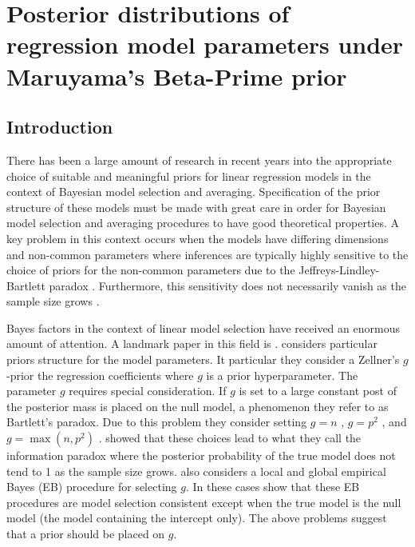 \chapter{Posterior distributions of regression model parameters under Maruyama's Beta-Prime prior}

\section{Introduction}

There has been a large amount of research in recent years into the appropriate choice of suitable 
and meaningful priors for linear regression models in the context of Bayesian model selection and 
averaging. Specification of the prior structure of these models must be made with great care in 
order for Bayesian model selection and averaging procedures to have good theoretical properties. 
A key problem in this context occurs when the models have differing dimensions and non-common 
parameters where inferences are typically highly sensitive to the choice of priors for the 
non-common parameters due to the Jeffreys-Lindley-Bartlett paradox \citep{Lindley1957,Bartlett1957,OrmerodEtal2017}.
Furthermore, this sensitivity does not necessarily vanish as the sample size 
grows \cite{Kass1995,Berger2001}.  

Bayes factors in the context of linear model selection 
\citep{Zellner1980,
	Zellner1980b,
	Mitchell1988,
	George1993,
	Fernandez2001,
	Liang2008,
	Maruyama2011,
	Bayarri2012}
have received an 
enormous amount of attention. A landmark paper in this field is \cite{Liang2008}.
\cite{Liang2008} considers particular priors structure for the model parameters. 
It particular they consider a Zellner's $g$-prior \cite{Zellner1980,Zellner1986} 
the regression coefficients where $g$ is a prior hyperparameter. The parameter $g$
requires special consideration. If $g$ is set to a large constant post of the posterior
mass is placed on the null model, a phenomenon they refer to as Bartlett's paradox.
Due to this problem they consider setting $g=n$ \citep{Kass1995b},  $g=p^2$ \cite{Foster1994},
and $g=\max(n,p^2)$ \citep{Fernandez2001}. \cite{Liang2008} showed that these choices
lead to what they call the information paradox where the posterior probability of the
true model does not tend to 1 as the sample size grows. \cite{Liang2008} also considers
a local and global empirical Bayes (EB) procedure for selecting $g$. In these cases \cite{Liang2008}
show that these EB procedures are model selection consistent except when the true model is the null
model (the model containing the intercept only). The above problems suggest that a prior should
be placed on $g$.

